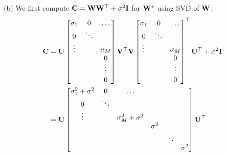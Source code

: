 (b) We first compute $\mathbf C = \mathbf W \mathbf W^\top + \sigma^2 \mathbf{I}$ for $\mathbf W^*$ using SVD of $\mathbf W$:
\begin{equation*}
\begin{aligned}
\mathbf C &= \mathbf U
\begin{bmatrix} 
    \sigma_{1} & 0 & \dots \\
    0 & \ddots & \\
    \vdots &        & \sigma_M \\ 
     &   & 0 \\
     & & \vdots \\
     & & 0
    \end{bmatrix} \mathbf V^\top \mathbf V 
    \begin{bmatrix} 
    \sigma_{1} & 0 & \dots \\
    0 & \ddots & \\
    \vdots &        & \sigma_M \\ 
     &   & 0 \\
     & & \vdots \\
     & & 0
    \end{bmatrix}^\top \mathbf U^\top + \sigma^2 \mathbf{I} \\
&= \mathbf U
\begin{bmatrix} 
    \sigma_{1}^2 + \sigma^2 & 0 & \dots \\
    0 & \ddots & \\
    \vdots &        & \sigma_M^2 + \sigma^2 \\ 
     &   &  & \sigma^2 \\
     & & & & \ddots & \\
     & & & & &  \sigma^2
    \end{bmatrix} \mathbf U^\top
\end{aligned}
\end{equation*}

